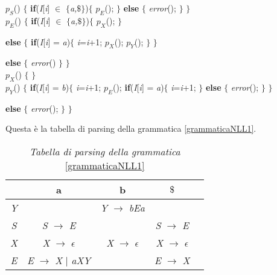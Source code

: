 $p_S$() $\{$ \textbf{if}(\textit{I}[\textit{i}] $\in$ $\{$\textit{a,$\$$}$\}$)$\{$ $p_E$(); $\}$ \textbf{else} $\{$ \textit{error}(); $\}$ $\}$ \\
\vspace{0.2cm}
$p_E$() $\{$ \textbf{if}(\textit{I}[\textit{i}] $\in$ $\{$\textit{a,$\$$}$\}$)$\{$ $p_X$(); $\}$ \par
\hspace{0.8cm}\textbf{else} $\{$ \textbf{if}(\textit{I}[\textit{i}] = \textit{a})$\{$ \textit{i}=\textit{i}+1; $p_X$(); $p_Y$(); $\}$
$\}$\par 
\hspace{0.7cm} \textbf{else} $\{$ \textit{error}() $\}$ $\}$ \\
\vspace{0.2cm}
$p_X$() $\{$ $\}$\\
\vspace{0.2cm}
$p_Y$() $\{$ \textbf{if}(\textit{I}[\textit{i}] = \textit{b})$\{$ \textit{i}=\textit{i}+1; $p_E$(); \textbf{if}(\textit{I}[\textit{i}] = \textit{a})$\{$ \textit{i}=\textit{i}+1; $\}$ \textbf{else} $\{$ \textit{error}(); $\}$ $\}$ \par	
\hspace{0.8cm}\textbf{else} $\{$ \textit{error}(); $\}$ $\}$\par
\vspace{0.5cm}Questa è la tabella di parsing della grammatica \ref{grammaticaNLL1}.
\begin{table}[hbpb]
	\centering
	\label{tabellaparsingNLL1}
	\begin{tabular}{ccccc} 
		\toprule
		& a & b & $\$$ \\ 
		\midrule
		\textit{Y} 	& & \textit{Y} $\to$ \textit{bEa} &     \\ 
		\textit{S} & \textit{S} $\to$ \textit{E}  &  & \textit{S} $\to$ \textit{E}   \\ 
		\textit{X} & \textit{X} $\to$ $\epsilon$ & \textit{X} $\to$ $\epsilon$ &  \textit{X} $\to$ $\epsilon$ \\ 
		\textit{E} 	& \textit{E} $\to$ \textit{X} $\mid$ \textit{aXY} & &  \textit{E} $\to$ \textit{X}  \\
		\bottomrule
	\end{tabular}
	\caption{\textit{Tabella di parsing della grammatica }\ref{grammaticaNLL1}}
\end{table} \par
